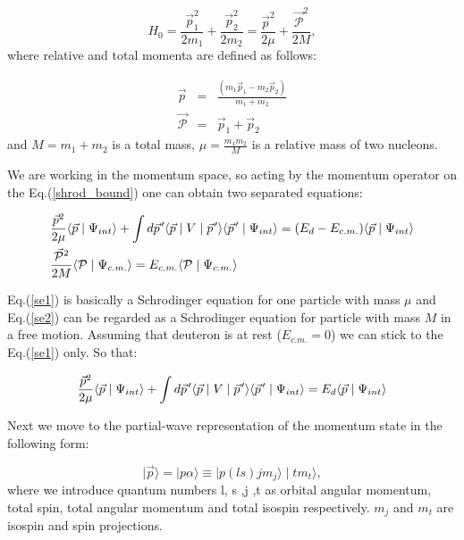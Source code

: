     \begin{equation}
        H_0 = \frac{\vec{p}_1^2}{2m_1} + \frac{\vec{p}_2^2}{2m_2} = 
        \frac{\vec{p}^2}{2\mu} + \frac{\vec{\mathcal{P}}^2}{2M}, 
    \end{equation}
    where relative and total momenta are defined as follows:

    \begin{eqnarray}
        \vec{p} &=& \frac{(m_1\vec{p}_1 - m_2\vec{p}_2)}{m_1 + m_2}\\
        \vec{\mathcal{P}} &=& \vec{p}_1 + \vec{p}_2
    \end{eqnarray}
    and $M = m_1 + m_2$ is a total mass, $\mu = \frac{m_1m_2}{M}$ is a relative mass of two nucleons.

    We are working in the momentum space, so acting by the momentum operator
    on the Eq.(\ref{shrod_bound}) one can obtain two separated equations:

    \begin{eqnarray}
        &\frac{\vec{p}^2}{2\mu} \langle \vec{p} \mid \Psi_{int} \rangle +
        \int d \pvec{p} \langle \vec{p} \mid V \mid \pvec{p} \rangle
        \langle \pvec{p} \mid \Psi_{int} \rangle = 
        (E_d - E_{c.m.})\langle \vec{p} \mid \Psi_{int} \rangle \label{se1}\\
        &\frac{\vec{\mathcal{P}}^2}{2M} \langle \mathcal{P} \mid \Psi_{c.m.} \rangle = 
        E_{c.m.}\langle \mathcal{P} \mid \Psi_{c.m.} \rangle \label{se2}
    \end{eqnarray}

    Eq.(\ref{se1}) is basically a Schrodinger equation for one particle with mass $\mu$ 
    and Eq.(\ref{se2}) can be regarded as a Schrodinger equation for particle with mass $M$ in 
    a free motion. Assuming that deuteron is at rest ($E_{c.m.} = 0$) we can stick 
    to the Eq.(\ref{se1}) only. So that:

    \begin{equation}
        \frac{\vec{p}^2}{2\mu} \langle \vec{p} \mid \Psi_{int} \rangle +
        \int d \pvec{p} \langle \vec{p} \mid V \mid \pvec{p} \rangle
        \langle \pvec{p} \mid \Psi_{int} \rangle = 
        E_d \langle \vec{p} \mid \Psi_{int} \rangle
        \label{shrod_old}
    \end{equation}

    Next we move to the partial-wave representation of the momentum state in the following form:

    \begin{equation}
        \mid \vec{p} \rangle = \mid p \alpha \rangle \equiv \mid p (ls) j m_j \rangle \mid t m_t \rangle,
        \label{pwmain}
    \end{equation}
    where we introduce quantum numbers l, s ,j ,t as orbital angular momentum, total spin,
    total angular momentum and total isospin respectively. $m_j$ and $m_t$ are isospin
    and spin projections.


